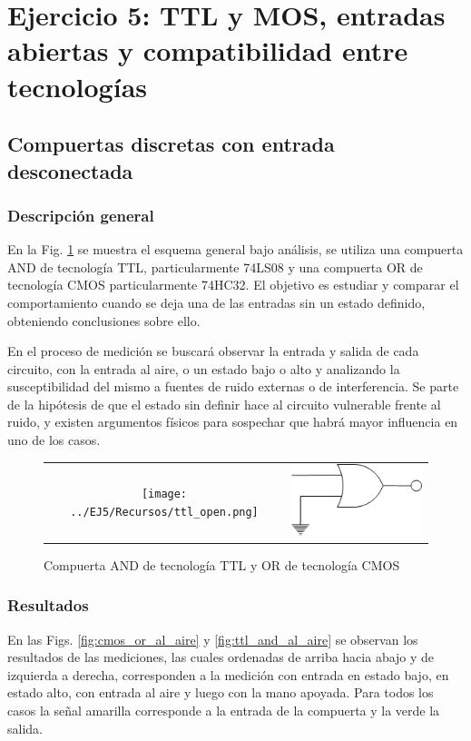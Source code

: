 \section{Ejercicio 5: TTL y MOS, entradas abiertas y compatibilidad entre tecnolog\'ias}

\subsection{Compuertas discretas con entrada desconectada}

\subsubsection{Descripci\'on general}
En la Fig. \ref{fig:open_gate_circuits} se muestra el esquema general bajo an\'alisis, se utiliza una compuerta AND de tecnolog\'ia TTL,
particularmente 74LS08 y una compuerta OR de tecnolog\'ia CMOS particularmente 74HC32. El objetivo es estudiar y comparar el comportamiento
cuando se deja una de las entradas sin un estado definido, obteniendo conclusiones sobre ello.

En el proceso de medici\'on se buscar\'a observar la entrada y salida de cada circuito, con la entrada al aire, o un estado bajo o alto y analizando
la susceptibilidad del mismo a fuentes de ruido externas o de interferencia. Se parte de la hip\'otesis de que el estado sin definir hace al circuito vulnerable
frente al ruido, y existen argumentos f\'isicos para sospechar que habr\'a mayor influencia en uno de los casos.

\begin{figure}[H]
    \centering
    \begin{tabular}{c c}
        \texttt{[image: ../EJ5/Recursos/ttl\_open.png]} &
        \includegraphics[scale=0.8]{../EJ5/Recursos/cmos_open.png}
    \end{tabular}
    \caption{Compuerta AND de tecnolog\'ia TTL y OR de tecnolog\'ia CMOS}
    \label{fig:open_gate_circuits}
\end{figure}

\subsubsection{Resultados}
En las Figs. \ref{fig:cmos_or_al_aire} y \ref{fig:ttl_and_al_aire} se observan los resultados de las mediciones, las cuales ordenadas de arriba hacia abajo y de izquierda a derecha, corresponden a la medici\'on
con entrada en estado bajo, en estado alto, con entrada al aire y luego con la mano apoyada. Para todos los casos la se\~nal amarilla corresponde a la entrada de la compuerta y la verde la salida.

